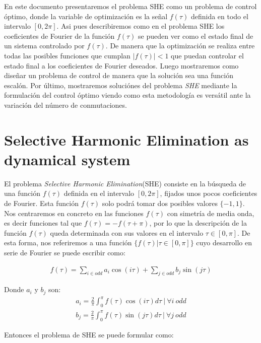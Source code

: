 
%
En este documento presentaremos el problema SHE como un problema de control óptimo, donde la variable de optimización es la señal $f(\tau)$ definida en todo el intervalo $[0,2\pi]$.
%
Asi pues describiremos como en el problema SHE los coeficientes de Fourier de la función $f(\tau)$ se pueden ver como el estado final de un sistema controlado por $f(\tau)$. 
%
De manera que la optimización se realiza entre todas las posibles funciones que cumplan $|f(\tau)|<1$ que puedan controlar el estado final a los coeficientes de Fourier deseados.  Luego mostraremos como diseñar un problema de control de manera que la solución sea una función escalón. Por último, mostraremos soluciónes del problema \emph{SHE} mediante la formulación del control óptimo viendo como esta metodología es versátil ante la variación del número de conmutaciones.
%


\section{Selective Harmonic Elimination as dynamical system}

%
El problema \emph{Selective Harmonic Elimination}(SHE) consiste en la búsqueda de una función $f(\tau )$ definida en el intervalo $[0,2\pi]$, fijados unos pocos coeficientes de Fourier. Esta función $f(\tau)$ solo podrá tomar dos posibles valores $\{-1,1\}$.
%
Nos centraremos en concreto en las funciones $f(\tau)$ con simetría de media onda, es decir funciones tal que $f(\tau) = -f(\tau + \pi)$, por lo que la descripción de la función $f(\tau)$ queda determinada con sus valores en el intervalo $\tau \in [0,\pi]$. De esta forma, nos referiremos a una función $\{ f(\tau)  | \tau \in [0,\pi] \}$ cuyo desarrollo en serie de Fourier se puede escribir como:

\begin{gather}
    f(\tau ) = \sum_{i \in odd} a_i \cos(i\tau)+ \sum_{j \in odd}  b_j \sin(j \tau) 
\end{gather}

Donde $a_i$ y $b_j$  son:
\begin{gather}
    a_i = \frac{2}{\pi} \int_0^\pi f(\tau ) \cos(i \tau)d\tau \ | \ \forall i \ odd \label{an}\\
    b_j = \frac{2}{\pi} \int_0^\pi f(\tau)  \sin(j \tau) d\tau \ | \ \forall j \ odd \label{bn}
\end{gather}


Entonces el problema de SHE se puede formular como:

